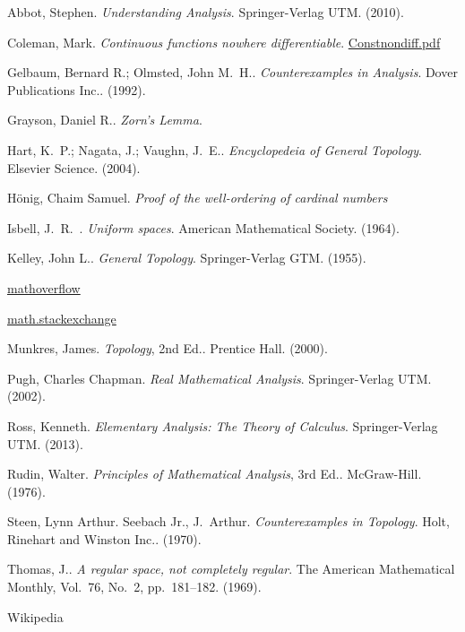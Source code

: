 \begin{thebibliography}{9}

Abbot, Stephen.  \textit{Understanding Analysis}.  Springer-Verlag UTM.  (2010).

Coleman, Mark.  \textit{Continuous functions nowhere differentiable}.  \href{http://www.maths.manchester.ac.uk/~mdc/MATH20101/notesPermanant/Contsnondiff.pdf}{Constnondiff.pdf}

Gelbaum, Bernard R.; Olmsted, John M.~H..  \textit{Counterexamples in Analysis}.  Dover Publications Inc..  (1992).

Grayson, Daniel R..  \textit{Zorn's Lemma}.

Hart, K.~P.; Nagata, J.; Vaughn, J.~E..  \textit{Encyclopedeia of General Topology}.  Elsevier Science.  (2004).

H\"{o}nig, Chaim Samuel.  \textit{Proof of the well-ordering of cardinal numbers}

Isbell, J.~R.~.  \textit{Uniform spaces}.  American Mathematical Society.  (1964).

Kelley, John L..  \textit{General Topology}.  Springer-Verlag GTM.  (1955).

\href{http://mathoverflow.net/}{mathoverflow}

\href{http://math.stackexchange.com/}{math.stackexchange}

Munkres, James.  \textit{Topology}, 2nd Ed..  Prentice Hall.  (2000).

Pugh, Charles Chapman.  \textit{Real Mathematical Analysis}.  Springer-Verlag UTM.  (2002).

Ross, Kenneth.  \textit{Elementary Analysis:  The Theory of Calculus}.  Springer-Verlag UTM.  (2013).

Rudin, Walter.  \textit{Principles of Mathematical Analysis}, 3rd Ed..  McGraw-Hill.  (1976).

Steen, Lynn Arthur.  Seebach Jr., J.~Arthur.  \textit{Counterexamples in Topology}.  Holt, Rinehart and Winston Inc..  (1970).

Thomas, J..  \textit{A regular space, not completely regular}.  The American Mathematical Monthly, Vol.~76, No.~2, pp.~181--182.  (1969).

Wikipedia

\end{thebibliography}